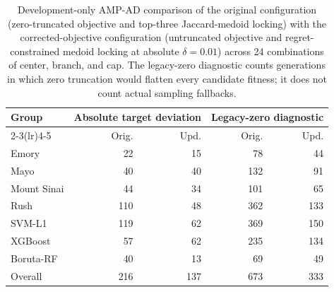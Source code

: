 ﻿\begin{table}[H]
\centering
\caption{Development-only AMP-AD comparison of the original configuration (zero-truncated objective and top-three Jaccard-medoid locking) with the corrected-objective configuration (untruncated objective and regret-constrained medoid locking at absolute $\delta=0.01$) across 24 combinations of center, branch, and cap. The legacy-zero diagnostic counts generations in which zero truncation would flatten every candidate fitness; it does not count actual sampling fallbacks.}
\label{tab:supp1}
\scriptsize
\setlength{\tabcolsep}{2.6pt}
\renewcommand{\arraystretch}{1.03}
\begin{tabular}{lrrrr}
\toprule
Group & \multicolumn{2}{c}{Absolute target deviation} & \multicolumn{2}{c}{Legacy-zero diagnostic} \\
\cmidrule(lr){2-3}\cmidrule(lr){4-5}
 & Orig. & Upd. & Orig. & Upd. \\
\midrule
Emory & 22 & 15 & 78 & 44 \\
Mayo & 40 & 40 & 132 & 91 \\
Mount Sinai & 44 & 34 & 101 & 65 \\
Rush & 110 & 48 & 362 & 133 \\
\midrule
SVM-L1 & 119 & 62 & 369 & 150 \\
XGBoost & 57 & 62 & 235 & 134 \\
Boruta-RF & 40 & 13 & 69 & 49 \\
\midrule
Overall & 216 & 137 & 673 & 333 \\
\bottomrule
\end{tabular}\par
\vspace{0.75em}
\end{table}
